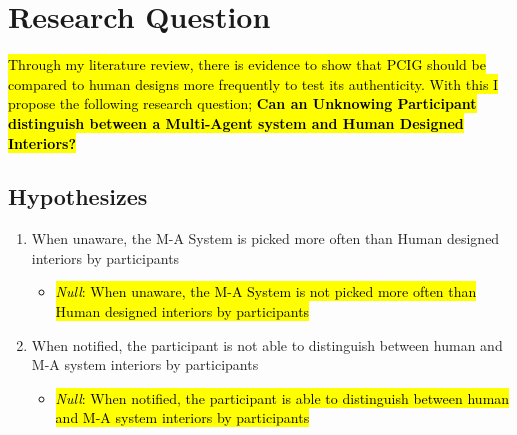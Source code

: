 \section{Research Question}

\hl{Through my literature review, there is evidence to show that PCIG should be compared to human designs more frequently to test its authenticity. With this I propose the following research question; \textbf{Can an Unknowing Participant distinguish between a Multi-Agent system and Human Designed Interiors?}}

\subsection{Hypothesizes}
\begin{enumerate}
    \item When unaware, the M-A System is picked more often than Human designed interiors by participants
        \begin{itemize}
            \item \hl{\textit{Null}: When unaware, the M-A System is not picked more often than Human designed interiors by participants}
        \end{itemize}
    \item When notified, the participant is not able to distinguish between human and M-A system interiors by participants
        \begin{itemize}
            \item \hl{\textit{Null}: When notified, the participant is able to distinguish between human and M-A system interiors by participants}
        \end{itemize}
\end{enumerate}